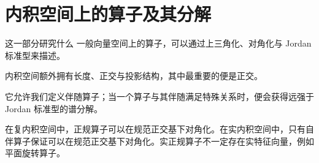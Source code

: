 
\part{内积空间上的算子及其分解}

\thispagestyle{plain}
\begin{partintro}{这一部分研究什么}
一般向量空间上的算子，可以通过上三角化、对角化与 Jordan 标准型来描述。

内积空间额外拥有长度、正交与投影结构，其中最重要的便是正交。

它允许我们定义伴随算子；当一个算子与其伴随满足特殊关系时，便会获得远强于 Jordan 标准型的谱分解。

\begin{jinsight}
在复内积空间中，正规算子可以在规范正交基下对角化。在实内积空间中，只有自伴算子保证可以在规范正交基下对角化。实正规算子不一定存在实特征向量，例如平面旋转算子。
\end{jinsight}
\end{partintro}
